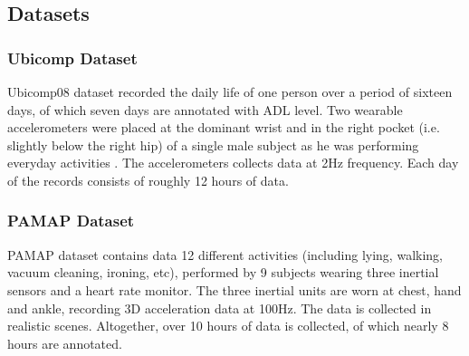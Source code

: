 \documentclass{sigchi}
\begin{document}
    \subsection{Datasets}

    \subsubsection{Ubicomp Dataset}
    Ubicomp08 dataset \cite{huynh2008discovery} recorded the daily life of one person over a period of sixteen days, of which seven days are annotated with ADL level.
    Two wearable accelerometers were placed at the dominant wrist and in the right pocket (i.e. slightly below the right hip) of a single male subject as he was performing everyday activities .
    The accelerometers collects data at 2Hz frequency.
    Each day of the records consists of roughly 12 hours of data.

    \subsubsection{PAMAP Dataset}
    PAMAP dataset \cite{reiss2012introducing, reiss2012creating} contains data 12 different activities (including lying, walking, vacuum cleaning, ironing, etc), performed by 9 subjects wearing three inertial sensors and a heart rate monitor.
    The three inertial units are worn at chest, hand and ankle, recording 3D acceleration data at 100Hz.
    The data is collected in realistic scenes.
    Altogether, over 10 hours of data is collected, of which nearly 8 hours are annotated.
\end{document}
